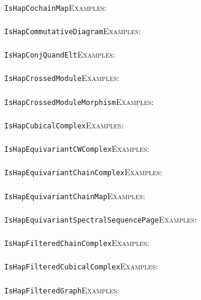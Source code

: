 \documentclass[a4paper,11pt]{report}
\begin{document}
{{ \\
 \texttt{IsHapCochainMap}{\nobreakspace}{\nobreakspace}{\nobreakspace}{\nobreakspace}\textsc{Examples:} \\
 \\
 \texttt{IsHapCommutativeDiagram}{\nobreakspace}{\nobreakspace}{\nobreakspace}{\nobreakspace}\textsc{Examples:} \\
 \\
 \texttt{IsHapConjQuandElt}{\nobreakspace}{\nobreakspace}{\nobreakspace}{\nobreakspace}\textsc{Examples:} \\
 \\
 \texttt{IsHapCrossedModule}{\nobreakspace}{\nobreakspace}{\nobreakspace}{\nobreakspace}\textsc{Examples:} \\
 \\
 \texttt{IsHapCrossedModuleMorphism}{\nobreakspace}{\nobreakspace}{\nobreakspace}{\nobreakspace}\textsc{Examples:} \\
 \\
 \texttt{IsHapCubicalComplex}{\nobreakspace}{\nobreakspace}{\nobreakspace}{\nobreakspace}\textsc{Examples:} \\
 \\
 \texttt{IsHapEquivariantCWComplex}{\nobreakspace}{\nobreakspace}{\nobreakspace}{\nobreakspace}\textsc{Examples:} \\
 \\
 \texttt{IsHapEquivariantChainComplex}{\nobreakspace}{\nobreakspace}{\nobreakspace}{\nobreakspace}\textsc{Examples:} \\
 \\
 \texttt{IsHapEquivariantChainMap}{\nobreakspace}{\nobreakspace}{\nobreakspace}{\nobreakspace}\textsc{Examples:} \\
 \\
 \texttt{IsHapEquivariantSpectralSequencePage}{\nobreakspace}{\nobreakspace}{\nobreakspace}{\nobreakspace}\textsc{Examples:} \\
 \\
 \texttt{IsHapFilteredChainComplex}{\nobreakspace}{\nobreakspace}{\nobreakspace}{\nobreakspace}\textsc{Examples:} \\
 \\
 \texttt{IsHapFilteredCubicalComplex}{\nobreakspace}{\nobreakspace}{\nobreakspace}{\nobreakspace}\textsc{Examples:} \\
 \\
 \texttt{IsHapFilteredGraph}{\nobreakspace}{\nobreakspace}{\nobreakspace}{\nobreakspace}\textsc{Examples:} \\
 \\
}}
\end{document}

